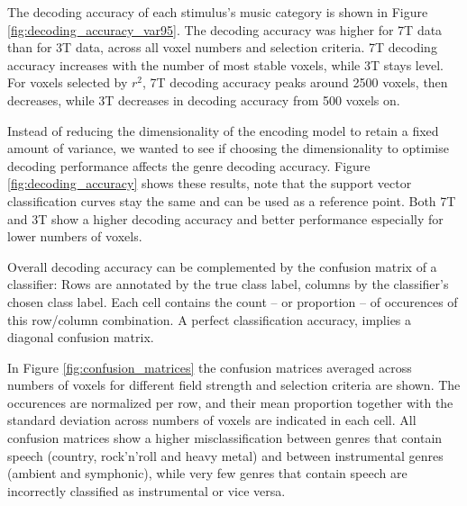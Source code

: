 The decoding accuracy of each stimulus's music category is shown in Figure
\ref{fig:decoding_accuracy_var95}.  The decoding accuracy was higher for 7T data than for
3T data, across all voxel numbers and selection criteria. 7T decoding
accuracy increases with the number of most stable voxels, while 3T stays level.
For voxels selected by $r^2$, 7T decoding accuracy peaks around 2500 voxels,
then decreases, while 3T decreases in decoding accuracy from 500 voxels
on. 


Instead of reducing the dimensionality of the encoding model to retain a fixed
amount of variance, we wanted to see if choosing the dimensionality to optimise decoding
performance affects the genre decoding accuracy.
Figure \ref{fig:decoding_accuracy} shows these results, note that the support vector
classification curves stay the same and can be used as a reference point.
Both 7T and 3T show a higher decoding accuracy and better performance especially
for lower numbers of voxels. 

Overall decoding accuracy can be complemented by the confusion matrix of a
classifier: Rows are annotated by the true class label, columns by the
classifier's chosen class label. Each cell contains the count -- or proportion
-- of occurences of this row/column combination. A perfect classification
accuracy, implies a diagonal confusion matrix.

In Figure \ref{fig:confusion_matrices} the confusion matrices averaged across
numbers of voxels for different field strength and selection criteria are shown.
The occurences are normalized per row, and their mean proportion together with
the standard deviation across numbers of voxels are indicated in each cell. All
confusion matrices show a higher misclassification between genres that contain
speech (country, rock'n'roll and heavy metal) and between instrumental genres
(ambient and symphonic), while very few genres that contain speech are
incorrectly classified as instrumental or vice versa.

%  
%	
%
%
%  
%	
%
%
%  
%	
%
%

